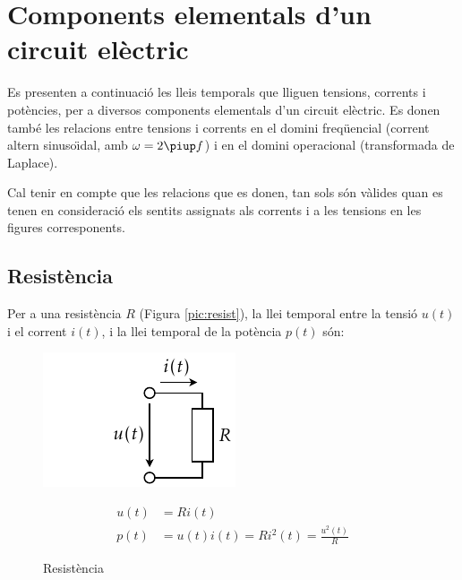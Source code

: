 \section{Components elementals d'un circuit
el\`{e}ctric}\label{sec:comp_elem}

Es presenten a continuaci\'{o} les lleis temporals que lliguen tensions,
corrents i pot\`{e}ncies, per a diversos components elementals d'un
circuit el\`{e}ctric. Es donen tamb\'{e} les relacions entre tensions i
corrents en el domini freq\"{u}encial (corrent altern sinuso\"{\i}dal, amb
$\omega=2\piup f$) i en el domini operacional (transformada de
Laplace).

Cal tenir en compte que les relacions que es donen, tan sols s\'{o}n
v\`{a}lides  quan es tenen en consideraci\'{o} els sentits assignats als
corrents i a les tensions en les figures corresponents.

\subsection{Resist\`{e}ncia} 

Per a una resist\`{e}ncia $R$ (Figura
\vref{pic:resist}), la llei temporal entre la tensi\'{o} $u(t)$ i el
corrent $i(t)$, i la llei temporal de la pot\`{e}ncia $p(t)$ s\'{o}n:
\vspace{-0.5mm}
\begin{figure}[h!]
\hfill
\begin{minipage}[b]{5cm}
    \includegraphics{Imatges/Cap-Fonaments-Resistencia.pdf}
\caption{Resist\`{e}ncia} \label{pic:resist}
\end{minipage}
\hfill
\begin{minipage}[b][3.25cm][t]{8cm}
   \begin{align}
      u(t) &= R i(t) \\  p(t) &= u(t) i(t) = R i^2(t) = \frac{u^2(t)}{R}
   \end{align}
\end{minipage}
\end{figure}


